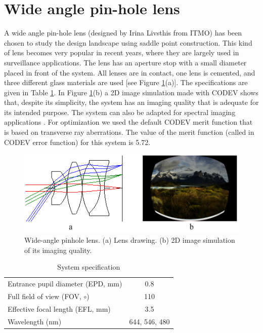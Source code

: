 \section{Wide angle pin-hole lens}

A wide angle pin-hole lens (designed by Irina Livsthis from ITMO) has been chosen to study the design landscape using saddle point construction. This kind of lens becomes very popular in recent years, where they are largely used in surveillance applications. The lens has an aperture stop with a small diameter placed in front of the system. All lenses are in contact, one lens is cemented, and three different glass materials are used [see Figure \ref{fig:widepinLens}(a)]. The specifications are given in Table \ref{table: sysspec}. In Figure \ref{fig:widepinLens}(b) a 2D image simulation made with CODEV shows that, despite its simplicity, the system has an imaging quality that is adequate for its intended purpose. The system can also be adapted for spectral imaging applications \cite{Strauch2015}. For optimization we used the default CODEV merit function that is based on transverse ray aberrations. The value of the merit function (called in CODEV error function) for this system is 5.72.

\begin{figure}[h!]
    \centering
    \includegraphics[scale=0.72]{chapter-3/figures/WidePinLens.png}
    \caption{Wide-angle pinhole lens. (a) Lens drawing. (b) 2D image simulation of its imaging quality.}
    \label{fig:widepinLens}
\end{figure}

\setlength{\arrayrulewidth}{.5mm}
\setlength{\tabcolsep}{18pt}
\renewcommand{\arraystretch}{1.2}
\begin{table}[h!]
    \centering
    \captionsetup{justification=centering}
    \caption{System specification}
    \label{table: sysspec}
    \vspace{-1em}
    \begin{tabular}{ p{20em} c }
    \hline 
    Entrance pupil diameter (EPD, mm) & 0.8\\
    Full field of view (FOV, ${\circ}$) & 110\\
    Effective focal length (EFL, mm) & 3.5\\
    Wavelength (nm) & 644, 546, 480\\
    \hline
    \end{tabular}
\end{table}





